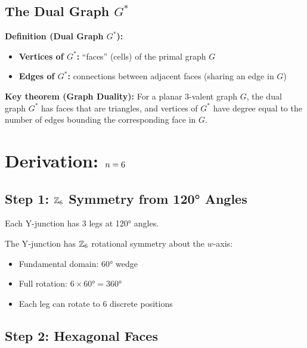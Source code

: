 \subsection{The Dual Graph $G^*$}

\textbf{Definition (Dual Graph $G^*$):}
\begin{itemize}
    \item \textbf{Vertices of $G^*$:} ``faces'' (cells) of the primal graph $G$
    \item \textbf{Edges of $G^*$:} connections between adjacent faces (sharing an edge in $G$)
\end{itemize}

\textbf{Key theorem (Graph Duality):} For a planar 3-valent graph $G$, the dual
graph $G^*$ has faces that are triangles, and vertices of $G^*$ have degree
equal to the number of edges bounding the corresponding face in $G$.

\section{Derivation: $n = 6$}
\label{sec:M6:derivation}

\subsection{Step 1: $\Zsix$ Symmetry from 120° Angles}

Each Y-junction has 3 legs at 120° angles.

\begin{derivationbox}[title=$\Zsix$ Symmetry]
    The Y-junction has $\Zsix$ rotational symmetry about the $w$-axis: \tagDc
    \begin{itemize}
        \item Fundamental domain: 60° wedge
        \item Full rotation: $6 \times 60° = 360°$
        \item Each leg can rotate to 6 discrete positions
    \end{itemize}
\end{derivationbox}

\subsection{Step 2: Hexagonal Faces}

